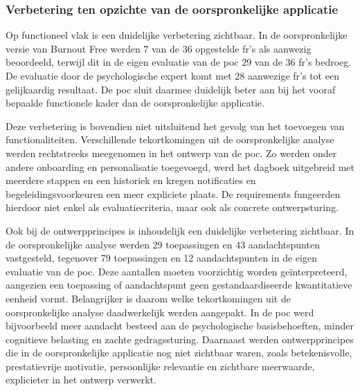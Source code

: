 \vspace{1em}

\subsubsection{Verbetering ten opzichte van de oorspronkelijke applicatie}
\label{subsec:verbetering-oorspronkelijke-app}

\vspace{1em}

Op functioneel vlak is een duidelijke verbetering zichtbaar. In de oorspronkelijke versie van Burnout Free werden 7 van de 36 opgestelde \acrshort{fr}'s als aanwezig beoordeeld, terwijl dit in de eigen evaluatie van de \acrshort{poc} 29 van de 36 \acrshort{fr}'s bedroeg. De evaluatie door de psychologische expert komt met 28 aanwezige \acrshort{fr}'s tot een gelijkaardig resultaat. De \acrshort{poc} sluit daarmee duidelijk beter aan bij het vooraf bepaalde functionele kader dan de oorspronkelijke applicatie.

\vspace{1em}

Deze verbetering is bovendien niet uitsluitend het gevolg van het toevoegen van functionaliteiten. Verschillende tekortkomingen uit de oorspronkelijke analyse werden rechtstreeks meegenomen in het ontwerp van de \acrshort{poc}. Zo werden onder andere onboarding en personalisatie toegevoegd, werd het dagboek uitgebreid met meerdere stappen en een historiek en kregen notificaties en begeleidingsvoorkeuren een meer expliciete plaats. De requirements fungeerden hierdoor niet enkel als evaluatiecriteria, maar ook als concrete ontwerpsturing.

\vspace{1em}

Ook bij de ontwerpprincipes is inhoudelijk een duidelijke verbetering zichtbaar. In de oorspronkelijke analyse werden 29 toepassingen en 43 aandachtspunten vastgesteld, tegenover 79 toepassingen en 12 aandachtspunten in de eigen evaluatie van de \acrshort{poc}. Deze aantallen moeten voorzichtig worden geïnterpreteerd, aangezien een toepassing of aandachtspunt geen gestandaardiseerde kwantitatieve eenheid vormt. Belangrijker is daarom welke tekortkomingen uit de oorspronkelijke analyse daadwerkelijk werden aangepakt. In de \acrshort{poc} werd bijvoorbeeld meer aandacht besteed aan de psychologische basisbehoeften, minder cognitieve belasting en zachte gedragssturing. Daarnaast werden ontwerpprincipes die in de oorspronkelijke applicatie nog niet zichtbaar waren, zoals betekenisvolle, prestatievrije motivatie, persoonlijke relevantie en zichtbare meerwaarde, explicieter in het ontwerp verwerkt.

